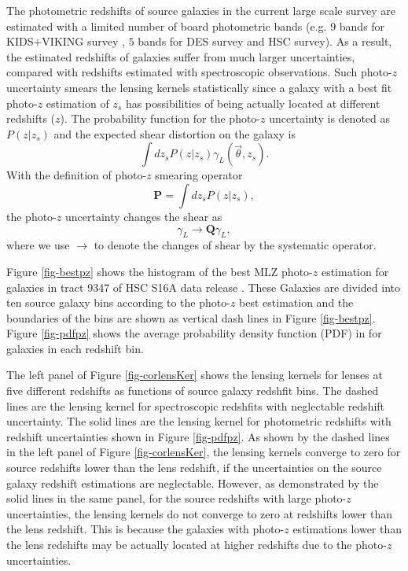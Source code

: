 \documentclass[twocolumn]{aastex62}
\begin{document}
The photometric redshifts of source galaxies in the current large scale survey are estimated with a limited number of 
board photometric bands (e.g. $9$ bands for KIDS$+$VIKING survey \citep{KIDS_VIKING-Hildebrant2020}, $5$ bands for DES 
survey and HSC survey). As a result, the estimated redshifts of galaxies suffer from much larger uncertainties, compared 
with redshifts estimated with spectroscopic observations. Such photo-$z$ uncertainty smears the lensing kernels statistically 
since a galaxy with a best fit photo-$z$ estimation of $z_s$ has possibilities of being actually located at different 
redshifts ($z$). The probability function for the photo-$z$ uncertainty is denoted as $P(z|z_s)$ and the expected shear 
distortion on the galaxy is
\begin{equation}\label{eq-delta2gamma-poz}
\int dz_s P(z|z_s) \gamma_L(\vec{\theta},z_s).
\end{equation}
With the definition of photo-$z$ smearing operator
\begin{equation}
\mathbf{P} = \int dz_s P(z|z_s),
\end{equation}
the photo-$z$ uncertainty changes the shear as 
\begin{equation}
\gamma_L \rightarrow \mathbf{Q} \gamma_L,
\end{equation}
where we use $\rightarrow$ to denote the changes of shear by the systematic operator.


Figure \ref{fig-bestpz} shows the histogram of the best MLZ photo-$z$ estimation \cite{HSC1-photoz} for galaxies in tract 
9347 of HSC S16A data release \citep{HSC1-data}. These Galaxies are divided into ten source galaxy bins according to the 
photo-$z$ best estimation and the boundaries of the bins are shown as vertical dash lines in Figure \ref{fig-bestpz}. 
Figure \ref{fig-pdfpz} shows the average probability density function (PDF) in for galaxies in each redshift bin. 

The left panel of Figure \ref{fig-corlensKer} shows the lensing kernels for lenses at five different redshifts as functions 
of source galaxy redshfit bins. The dashed lines are the lensing kernel for spectroscopic redshfits with neglectable redshift 
uncertainty. The solid lines are the lensing kernel for photometric redshifts with redshift uncertainties shown in Figure 
\ref{fig-pdfpz}. 
As shown by the dashed lines in the left panel of Figure \ref{fig-corlensKer}, the lensing kernels converge to zero for source 
redshifts lower than the lens redshift, if the uncertainties on the source galaxy redshift estimations are neglectable. However,
as demonstrated by the solid lines in the same panel, for the source redshifts with large photo-$z$ uncertainties, the lensing 
kernels do not converge to zero at redshifts lower than the lens redshift. This is because the galaxies with photo-$z$ estimations 
lower than the lens redshifts may be actually located at higher redshifts due to the photo-$z$ uncertainties.
\end{document}
